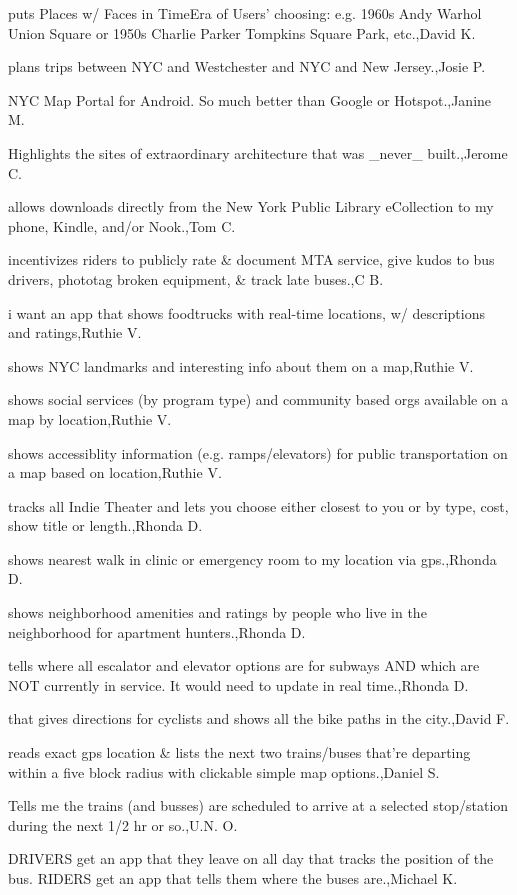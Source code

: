 \documentclass{article}
\begin{document}
puts Places w/ Faces in TimeEra of Users' choosing: e.g. 1960s Andy Warhol Union Square or 1950s Charlie Parker Tompkins Square Park, etc.,David K.

plans trips between NYC and Westchester and NYC and New Jersey.,Josie P.

NYC Map Portal for Android. So much better than Google or Hotspot.,Janine M.

Highlights the sites of extraordinary architecture that was \_never\_ built.,Jerome C.

allows downloads directly from the New York Public Library eCollection to my phone, Kindle, and/or Nook.,Tom C.

incentivizes riders to publicly rate \& document MTA service, give kudos to bus drivers, phototag broken equipment, \& track late buses.,C B.

i want an app that shows foodtrucks with real-time locations, w/ descriptions and ratings,Ruthie V.

shows NYC landmarks and interesting info about them on a map,Ruthie V.

shows social services (by program type) and community based orgs available on a map by location,Ruthie V.

shows accessiblity information (e.g. ramps/elevators) for public transportation on a map based on location,Ruthie V.

tracks all Indie Theater and lets you choose either closest to you or by type, cost, show title or length.,Rhonda D.

shows nearest walk in clinic or emergency room to my location via gps.,Rhonda D.

shows neighborhood amenities and ratings by people who live in the neighborhood for apartment hunters.,Rhonda D.

tells where all escalator and elevator options are for subways AND which are NOT currently in service. It would need to update in real time.,Rhonda D.

that gives directions for cyclists and shows all the bike paths in the city.,David F.

reads exact gps location \& lists the next two trains/buses that're departing within a five block radius with clickable simple map options.,Daniel S.

Tells me the trains (and busses) are scheduled to arrive at a selected stop/station during the next 1/2 hr or so.,U.N. O.

DRIVERS get an app that they leave on all day that tracks the position of the bus. RIDERS get an app that tells them where the buses are.,Michael K.
\end{document}
